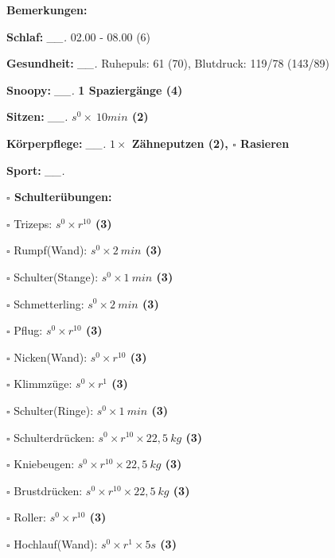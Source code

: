\documentclass[10pt,a4paper]{article}
\newcommand\prop[1] {{\color {alizarin} {\bf #1}}}             %
\newcommand\draf[1] {{\color {amber(sae/ece)} {\bf #1}}}       %
\newcommand\mand[1] {{\color {burntorange} {\bf #1}}}          %
\newcommand\topspace{\vskip -15pt \hskip 20pt}
\newcommand\n[1] { {\sl #1.} \hskip 5pt }
\begin{document}
\begin{mdframed}[style=daystyle]
  \begin{labeling}{{\mand {Bemerkungen:}}}
    \setlength\itemsep{-3pt}
  \item[{\mand {Schlaf:}}]        \n{\_\_} 02.00 - 08.00 (6)
  \item[{\mand {Gesundheit:}}]    \n{\_\_} Ruhepuls: 61 (70), Blutdruck: 119/78 (143/89)
  \item[{\mand {Snoopy:}}]        \n{\_\_} {\draf {1 Spaziergänge (4)}}    
  \item[{\mand {Sitzen:}}]        \n{\_\_} {\prop {$s^0 \times\ 10 min$ (2)}}
  \item[{\mand {Körperpflege:}}]  \n{\_\_} {\draf {$1 \times$ Zähneputzen (2), $\square$ Rasieren}}
  \item[{\mand {Sport:}}]         \n{\_\_}
    \topspace
    \begin{minipage}{0.75\textwidth}  
      \begin{labeling}{\prop {$\square$ {Schulterübungen:}}} 
        \setlength\itemsep{-3pt}
      \item[$\square$ Trizeps:]          {\prop {$s^0 \times r^{10}$ (3)}}
      \item[$\square$ Rumpf(Wand):]      {\prop {$s^0 \times 2\ min$ (3)}}
      \item[$\square$ Schulter(Stange):] {\prop {$s^0 \times 1\ min$ (3)}}
      \item[$\square$ Schmetterling:]    {\prop {$s^0 \times 2\ min$ (3)}}
      \item[$\square$ Pflug:]            {\prop {$s^0 \times r^{10}$ (3)}}
      \item[$\square$ Nicken(Wand):]     {\prop {$s^0 \times r^{10}$ (3)}}
      \item[$\square$ Klimmzüge:]        {\prop {$s^0 \times r^1$ (3)}}
      \item[$\square$ Schulter(Ringe):]  {\prop {$s^0 \times 1\ min$ (3)}}
      \item[$\square$ Schulterdrücken:]  {\prop {$s^0 \times r^{10} \times 22,5\ kg$ (3)}}
      \item[$\square$ Kniebeugen:]       {\prop {$s^0 \times r^{10} \times 22,5\ kg$ (3)}}
      \item[$\square$ Brustdrücken:]     {\prop {$s^0 \times r^{10} \times 22,5\ kg$ (3)}}
      \item[$\square$ Roller:]           {\prop {$s^0 \times r^{10}$ (3)}}
      \item[$\square$ Hochlauf(Wand):]   {\prop {$s^0 \times r^{1} \times 5s$ (3)}}

\end{labeling}
\end{minipage}
\end{labeling}
\end{mdframed}
\end{document}
